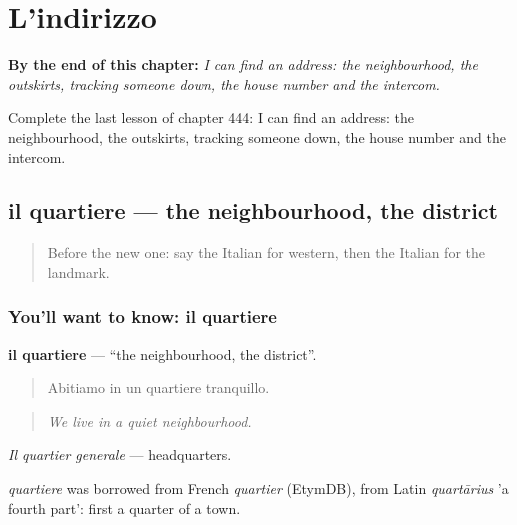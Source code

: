 
\chapter{L'indirizzo}
\label{ch:it-l-indirizzo}

\begin{chapteropening}
\textbf{By the end of this chapter:} \emph{I can find an address: the neighbourhood, the outskirts, tracking someone down, the house number and the intercom.}

Complete the last lesson of chapter 444: I can find an address: the neighbourhood, the outskirts, tracking someone down, the house number and the intercom.
\end{chapteropening}

\section[il quartiere]{il quartiere — the neighbourhood, the district}

\label{lesson:IT-C444-quartiere}



\begin{quote}
Before the new one: say the Italian for western, then the Italian for the landmark.
\end{quote}

\subsection*{You'll want to know: il quartiere}
\textbf{il quartiere} — \textquotedblleft{}the neighbourhood, the district\textquotedblright{}.

\begin{quote}
Abitiamo in un quartiere tranquillo.
\end{quote}

\begin{quote}
\emph{We live in a quiet neighbourhood.}
\end{quote}

\emph{Il quartier generale} — headquarters.

\begin{cousinweb}
\emph{quartiere} was borrowed from French \emph{quartier} (EtymDB), from Latin \emph{quartārius} 'a fourth part': first a quarter of a town.
\end{cousinweb}


